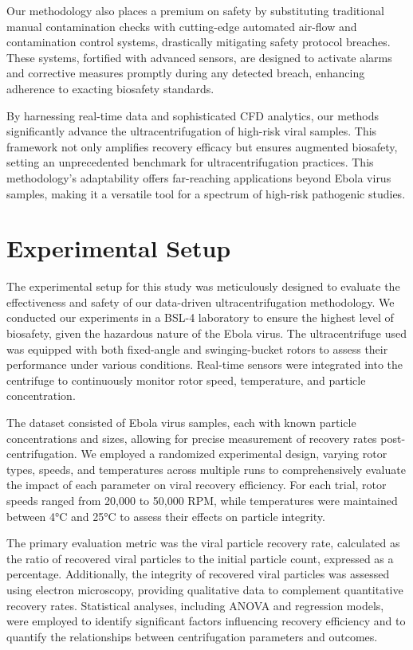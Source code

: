 \documentclass{article}
\begin{document}
Our methodology also places a premium on safety by substituting traditional manual contamination checks with cutting-edge automated air-flow and contamination control systems, drastically mitigating safety protocol breaches. These systems, fortified with advanced sensors, are designed to activate alarms and corrective measures promptly during any detected breach, enhancing adherence to exacting biosafety standards.

By harnessing real-time data and sophisticated CFD analytics, our methods significantly advance the ultracentrifugation of high-risk viral samples. This framework not only amplifies recovery efficacy but ensures augmented biosafety, setting an unprecedented benchmark for ultracentrifugation practices. This methodology's adaptability offers far-reaching applications beyond Ebola virus samples, making it a versatile tool for a spectrum of high-risk pathogenic studies.

\section{Experimental Setup}
The experimental setup for this study was meticulously designed to evaluate the effectiveness and safety of our data-driven ultracentrifugation methodology. We conducted our experiments in a BSL-4 laboratory to ensure the highest level of biosafety, given the hazardous nature of the Ebola virus. The ultracentrifuge used was equipped with both fixed-angle and swinging-bucket rotors to assess their performance under various conditions. Real-time sensors were integrated into the centrifuge to continuously monitor rotor speed, temperature, and particle concentration.

The dataset consisted of Ebola virus samples, each with known particle concentrations and sizes, allowing for precise measurement of recovery rates post-centrifugation. We employed a randomized experimental design, varying rotor types, speeds, and temperatures across multiple runs to comprehensively evaluate the impact of each parameter on viral recovery efficiency. For each trial, rotor speeds ranged from 20,000 to 50,000 RPM, while temperatures were maintained between 4°C and 25°C to assess their effects on particle integrity.

The primary evaluation metric was the viral particle recovery rate, calculated as the ratio of recovered viral particles to the initial particle count, expressed as a percentage. Additionally, the integrity of recovered viral particles was assessed using electron microscopy, providing qualitative data to complement quantitative recovery rates. Statistical analyses, including ANOVA and regression models, were employed to identify significant factors influencing recovery efficiency and to quantify the relationships between centrifugation parameters and outcomes.
\end{document}
